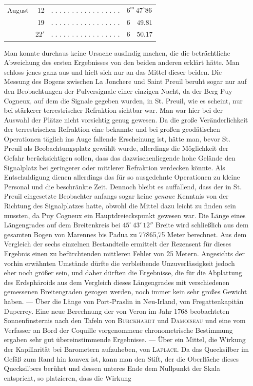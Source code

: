 \begin{center}\small\setlength{\tabcolsep}{3pt}
\begin{tabular}{lrll}
August & 12 & . . . . . . . . . . . . . . . . . & $6^{\mathrm m}\ 47^{\mathrm s}86$ \\
 & 19 & . . . . . . . . . . . . . . . . . & $6\quad49.81$ \\
 & $22'$ & . . . . . . . . . . . . . . . . . & $6\quad50.17$ \\
\end{tabular}\end{center}
\noindent Man konnte durchaus keine Ursache ausfindig machen, die die beträchtliche Abweichung des ersten Ergebnisses von den beiden anderen erklärt hätte. Man schloss jenes ganz aus und hielt sich nur an das Mittel dieser beiden. Die Messung des Bogens zwischen La Jonchere und Saint Preuil beruht sogar nur auf den Beobachtungen der Pulversignale einer einzigen Nacht, da der Berg Puy Cogneux, auf dem die Signale gegeben wurden, in St. Preuil, wie es scheint, nur bei stärkerer terrestrischer Refraktion sichtbar war. Man war hier bei der Auswahl der Plätze nicht vorsichtig genug gewesen. Da die große Veränderlichkeit der terrestrischen Refraktion eine bekannte und bei großen geodätischen Operationen täglich ins Auge fallende Erscheinung ist, hätte man, bevor St. Preuil als Beobachtungsplatz gewählt wurde, allerdings die Möglichkeit der Gefahr berücksichtigen sollen, dass das dazwischenliegende hohe Gelände den Signalplatz bei geringerer oder mittlerer Refraktion verdecken könnte. Als Entschuldigung dienen allerdings das für so ausgedehnte Operationen zu kleine Personal und die beschränkte Zeit. Dennoch bleibt es auffallend, dass der in St. Preuil eingesetzte Beobachter anfangs sogar keine \emph{genaue} Kenntnis von der Richtung des Signalplatzes hatte, obwohl die Mittel dazu leicht zu finden sein mussten, da Puy Cogneux ein Hauptdreieckspunkt gewesen war. Die Länge eines Längengrades auf dem Breitenkreis bei $45^\circ\,43'\,12''$ Breite wird schließlich aus dem gesamten Bogen von Marennes bis Padua zu 77865,75 Meter berechnet. Aus dem Vergleich der sechs einzelnen Bestandteile ermittelt der Rezensent für dieses Ergebnis einen zu befürchtenden mittleren Fehler von 25 Metern. Angesichts der vorhin erwähnten Umstände dürfte die verbleibende Unzuverlässigkeit jedoch eher noch größer sein, und daher dürften die Ergebnisse, die für die Abplattung des Erdsphäroids aus dem Vergleich dieses Längengrades mit verschiedenen gemessenen Breitengraden gezogen werden, noch immer kein sehr großes Gewicht haben. — Über die Länge von Port-Praslin in Neu-Irland, von Fregattenkapitän Duperrey. Eine neue Berechnung der von Veron im Jahr 1768 beobachteten Sonnenfinsternis nach den Tafeln von \textsc{Burckhardt} und \textsc{Damoiseau} und eine vom Verfasser an Bord der Coquille vorgenommene chronometrische Bestimmung ergaben sehr gut übereinstimmende Ergebnisse. — Über ein Mittel, die Wirkung der Kapillarität bei Barometern aufzuheben, von \textsc{Laplace}. Da das Quecksilber im Gefäß zum Rand hin konvex ist, kann man den Stift, der die Oberfläche dieses Quecksilbers berührt und dessen unteres Ende dem Nullpunkt der Skala entspricht, so platzieren, dass die Wirkung 